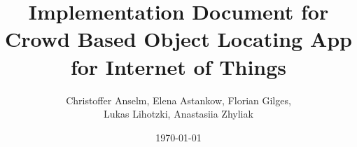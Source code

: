 \title{Implementation Document for Crowd Based Object Locating App for Internet of Things}
\author{Christoffer Anselm, Elena Astankow, Florian Gilges,\\
	Lukas Lihotzki, Anastasiia Zhyliak}
\date{\today}

\titlehead{\centering\texttt{[image: img/groupLogo/BLELoc-Logo]}\\[\baselineskip]
	{\Huge BLEloc}}
